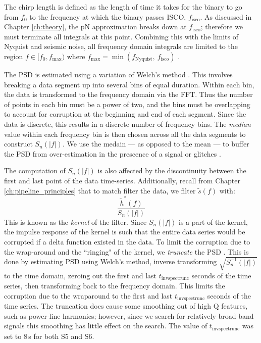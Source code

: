 The chirp length is defined as the length of time it takes for the binary to go
from $f_0$ to the frequency at which the binary passes \ac{ISCO},
$f_{\mathrm{isco}}$. As discussed in Chapter \ref{ch:theory}, the \ac{pN}
approximation breaks down at $f_{\mathrm{isco}}$; therefore we must terminate
all integrals at this point. Combining this with the limits of Nyquist and
seismic noise, all frequency domain integrals are limited to the region $f \in
[f_0, f_{\mathrm{max}})$ where $f_{\mathrm{max}} =
\min(f_{\mathrm{Nyquist}},~f_{\mathrm{isco}})$ \cite{ref:Brown}.

The \ac{PSD} is estimated using a variation of Welch's method \cite{Brown}.
This involves breaking a data segment up into several bins of equal duration.
Within each bin, the data is transformed to the frequency domain via the
\ac{FFT}. Thus the number of points in each bin must be a power of two, and the
bins must be overlapping to account for corruption at the beginning and end of
each segment. Since the data is discrete, this results in a discrete number of
frequency bins. The \emph{median} value within each frequency bin is then
chosen across all the data segments to construct $S_n(|f|)$. We use the medain
--- as opposed to the mean --- to buffer the \ac{PSD} from over-estimation in
the prescence of a signal or glitches \cite{Brown}.

The computation of $S_n(|f|)$ is also affected by the discontinuity between the
first and last point of the data time-series. Additionally, recall from Chapter
\ref{ch:pipeline_principles} that to match filter the data, we filter
$\widetilde{s}(f)$ with:
\begin{equation*}
\frac{\widetilde{h}^{*}(f)}{S_n(|f|)}
\end{equation*}
This is known as the \emph{kernel} of the filter. Since $S_n(|f|)$ is a part of
the kernel, the impulse response of the kernel is such that the entire data
series would be corrupted if a delta function existed in the data. To limit the
corruption due to the wrap-around and the ``ringing" of the kernel, we
\emph{truncate} the \ac{PSD} \cite{Brown}. This is done by estimating \ac{PSD}
using Welch's method, inverse transforming $\sqrt{S_n^{-1}(|f|)}$ to the time
domain, zeroing out the first and last $t_{\mathrm{invspectrunc}}$ seconds of
the time series, then transforming back to the frequency domain. This limits
the corruption due to the wraparound to the first and last
$t_{\mathrm{invspectrunc}}$ seconds of the time series. The truncation does
cause some smoothing out of high Q features, such as power-line harmonics;
however, since we search for relatively broad band signals this smoothing has
little effect on the search. The value of $t_{\mathrm{invspectrunc}}$ was set
to $8\,$s for both \ac{S5} and \ac{S6}.

